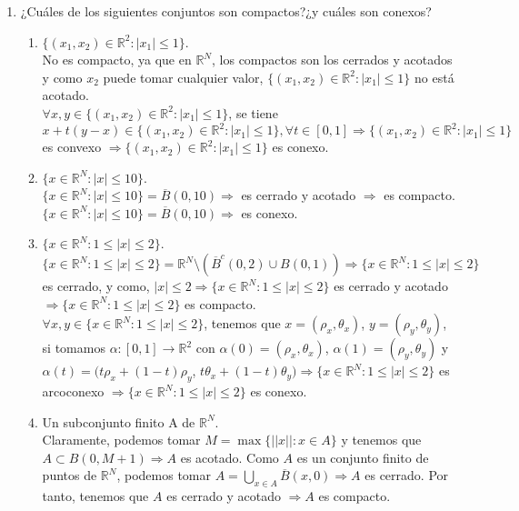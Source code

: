 \documentclass[a4paper, 11pt]{article} %
\begin{document}
\begin{enumerate}
\begin{enumerate}[label=\alph*)]
\begin{proof}
\begin{itemize}
			\end{itemize}
		\end{proof}
	\end{enumerate}
	\item ¿Cuáles de los siguientes conjuntos son compactos?¿y cuáles son conexos?
	\begin{enumerate}[label=\alph*)]
		\item $\{(x_1,x_2) \in \mathbb{R}^2: |x_1| \le 1\}$.\\
		No es compacto, ya que en $\mathbb{R}^N$, los compactos son los cerrados y acotados y como $x_2$ puede tomar cualquier valor, $\{(x_1,x_2) \in \mathbb{R}^2: |x_1| \le 1\}$ no está acotado.\\
		$\forall x,y \in \{(x_1,x_2) \in \mathbb{R}^2: |x_1| \le 1\}$, se tiene $x+t(y-x)\in \{(x_1,x_2) \in \mathbb{R}^2: |x_1| \le 1\}, \forall t \in [0,1] \Rightarrow \{(x_1,x_2) \in \mathbb{R}^2: |x_1| \le 1\}$ es convexo $\Rightarrow \{(x_1,x_2) \in \mathbb{R}^2: |x_1| \le 1\}$ es conexo.
		\item $\{x \in \mathbb{R}^N: |x| \le 10\}$.\\
		$\{x \in \mathbb{R}^N: |x| \le 10\} = \overline{B}(0,10) \Rightarrow $ es cerrado y acotado $\Rightarrow$ es compacto.\\
		$\{x \in \mathbb{R}^N: |x| \le 10\} = \overline{B}(0,10) \Rightarrow $ es conexo.
		\item $\{x \in \mathbb{R}^N: 1 \le |x| \le 2\}$.\\
		$\{x \in \mathbb{R}^N: 1 \le |x| \le 2\} = \mathbb{R}^N \setminus (\overline{B}^c(0,2) \cup B(0,1)) \Rightarrow \{x \in \mathbb{R}^N: 1 \le |x| \le 2\}$ es cerrado, y como, $|x| \le 2 \Rightarrow \{x \in \mathbb{R}^N: 1 \le |x| \le 2 \}$ es cerrado y acotado $\Rightarrow \{x \in \mathbb{R}^N: 1 \le |x| \le 2 \}$ es compacto.\\
		$\forall x,y \in \{x \in \mathbb{R}^N: 1 \le |x| \le 2\}$, tenemos que $x=(\rho_x, \theta_x)$, $y=(\rho_y, \theta_y)$, si tomamos $\alpha: [0,1] \rightarrow \mathbb{R}^2$ con $\alpha(0)=(\rho_x, \theta_x)$, $\alpha(1)=(\rho_y, \theta_y)$ y $\alpha(t)=(t\rho_x + (1-t)\rho_y$, $t\theta_x + (1-t)\theta_y) \Rightarrow \{x \in \mathbb{R}^N: 1 \le |x| \le 2\}$ es arcoconexo $\Rightarrow \{x \in \mathbb{R}^N: 1 \le |x| \le 2\}$ es conexo.
		\item Un subconjunto finito A de $\mathbb{R}^N$.\\
		Claramente, podemos tomar $M = \max\{||x||: x \in A\}$ y tenemos que $A \subset B(0,M+1) \Rightarrow A$ es acotado. Como $A$ es un conjunto finito de puntos de $\mathbb{R}^N$, podemos tomar $\displaystyle{A =\bigcup_{x \in A} \overline{B}(x,0)} \Rightarrow A$ es cerrado. Por tanto, tenemos que $A$ es cerrado y acotado $\Rightarrow A$ es compacto.\\

\end{enumerate}
\end{enumerate}
\end{document}
